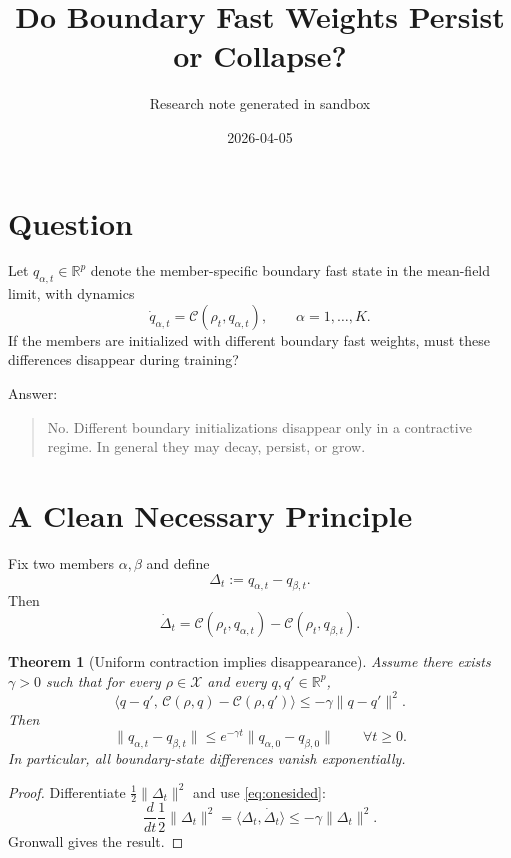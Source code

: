 \documentclass[11pt]{article}
\title{Do Boundary Fast Weights Persist or Collapse?}
\author{Research note generated in sandbox}
\date{2026-04-05}
\newcommand{\R}{\mathbb{R}}
\newtheorem{theorem}{Theorem}
\theoremstyle{remark}
\begin{document}
\maketitle

\section{Question}

Let $q_{\alpha,t}\in\R^p$ denote the member-specific boundary fast state in the mean-field limit, with dynamics
\begin{equation}
\dot q_{\alpha,t}=\mathcal C(\rho_t,q_{\alpha,t}),
\qquad
\alpha=1,\dots,K.
\label{eq:q-dynamics}
\end{equation}
If the members are initialized with different boundary fast weights, must these differences disappear during training?

\medskip

Answer:

\begin{quote}
No. Different boundary initializations disappear only in a contractive regime. In general they may decay, persist, or grow.
\end{quote}

\section{A Clean Necessary Principle}

Fix two members $\alpha,\beta$ and define
\[
\Delta_t:=q_{\alpha,t}-q_{\beta,t}.
\]
Then
\[
\dot\Delta_t
=
\mathcal C(\rho_t,q_{\alpha,t})-\mathcal C(\rho_t,q_{\beta,t}).
\]

\begin{theorem}[Uniform contraction implies disappearance]
\label{thm:uniform-contraction}
Assume there exists $\gamma>0$ such that for every $\rho\in\mathcal X$ and every $q,q'\in\R^p$,
\begin{equation}
\langle q-q',\,\mathcal C(\rho,q)-\mathcal C(\rho,q')\rangle
\le
-\gamma \|q-q'\|^2.
\label{eq:onesided}
\end{equation}
Then
\[
\|q_{\alpha,t}-q_{\beta,t}\|
\le
e^{-\gamma t}\|q_{\alpha,0}-q_{\beta,0}\|
\qquad
\forall t\ge 0.
\]
In particular, all boundary-state differences vanish exponentially.
\end{theorem}

\begin{proof}
Differentiate $\frac12\|\Delta_t\|^2$ and use \eqref{eq:onesided}:
\[
\frac{d}{dt}\frac12\|\Delta_t\|^2
=
\langle \Delta_t,\dot\Delta_t\rangle
\le
-\gamma \|\Delta_t\|^2.
\]
Gronwall gives the result.
\end{proof}
\end{document}
